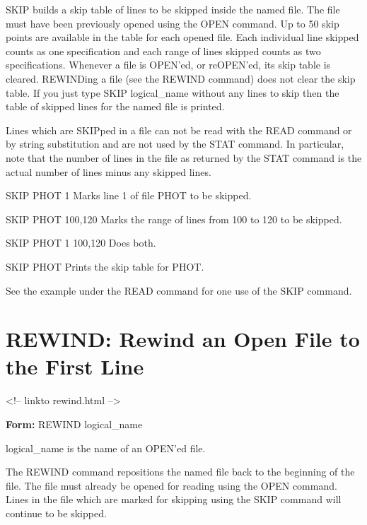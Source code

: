 SKIP builds a skip table of lines to be skipped inside the named file.  The
file must have been previously opened using the OPEN command.  Up to 50
skip points are available in the table for each opened file.  Each
individual line skipped counts as one specification and each range of lines
skipped counts as two specifications.  Whenever a file is OPEN'ed, or
reOPEN'ed, its skip table is cleared.  REWINDing a file (see the REWIND
command) does not clear the skip table.  If you just type SKIP
logical\_name without any lines to skip then the table of skipped lines for
the named file is printed.

Lines which are SKIPped in a file can not be read with the READ command or
by string substitution and are not used by the STAT command.  In
particular, note that the number of lines in the file as returned by the
STAT command is the actual number of lines minus any skipped lines.

\begin{example}
  \item[SKIP PHOT 1]{Marks line 1 of file PHOT to be skipped.}
  \item[SKIP PHOT 100,120]{Marks the range of lines from 100 to 120 to 
       be skipped.}
  \item[SKIP PHOT 1 100,120]{Does both.}
  \item[SKIP PHOT]{Prints the skip table for PHOT.}
\end{example}
See the example under the READ command for one use of the SKIP command.

\section{REWIND: Rewind an Open File to the First Line}
\begin{rawhtml}
<!-- linkto rewind.html -->
\end{rawhtml}
\begin{command}
  \item[\textbf{Form: }REWIND logical\_name\hfill]{}
  \item[logical\_name]{is the name of an OPEN'ed file.}
\end{command}

The REWIND command repositions the named file back to the beginning of the
file.  The file must already be opened for reading using the OPEN command.
Lines in the file which are marked for skipping using the SKIP command will
continue to be skipped.

